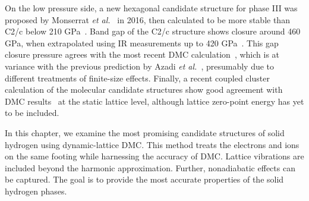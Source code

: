 On the low pressure side, a new hexagonal candidate structure for phase III was proposed by Monserrat \textit{et al.}~\cite{Monserrat2016} in 2016, then calculated to be more stable than C2/c below 210 GPa~\cite{Azadi2019}.
Band gap of the C2/c structure shows closure around 460 GPa, when extrapolated using IR measurements up to 420 GPa~\cite{Loubeyre2020}. This gap closure pressure agrees with the most recent DMC calculation~\cite{Gorelov2019}, which is at variance with the previous prediction by Azadi \textit{et al.}~\cite{Azadi2019}, presumably due to different treatments of finite-size effects.
Finally, a recent coupled cluster calculation of the molecular candidate structures show good agreement with DMC results~\cite{Liao2019} at the static lattice level, although lattice zero-point energy has yet to be included.

In this chapter, we examine the most promising candidate structures of solid hydrogen using dynamic-lattice DMC.
This method treats the electrons and ions on the same footing while harnessing the accuracy of DMC.
Lattice vibrations are included beyond the harmonic approximation. Further, nonadiabatic effects can be captured.
The goal is to provide the most accurate properties of the solid hydrogen phases.


